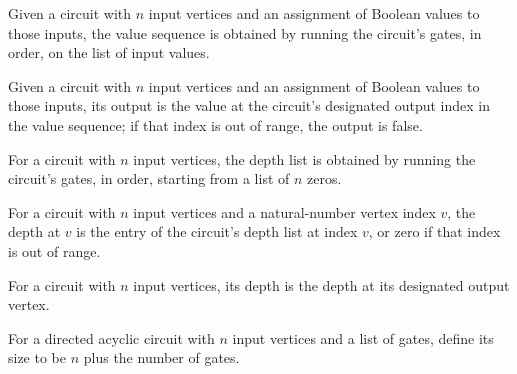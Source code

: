 \begin{definition}
\label{BoolCircuit.DAGCircuit.values}
\leanok
{}
Given a circuit with $n$ input vertices and an assignment of Boolean values to those
inputs, the value sequence is obtained by running the circuit's gates, in order, on the
list of input values.
\end{definition}

\begin{definition}
\label{BoolCircuit.DAGCircuit.eval}
\leanok
{}
Given a circuit with $n$ input vertices and an assignment of Boolean values to those
inputs, its output is the value at the circuit's designated output index in the value
sequence; if that index is out of range, the output is false.
\end{definition}

\begin{definition}
\label{BoolCircuit.DAGCircuit.depths}
\leanok
{}
For a circuit with $n$ input vertices, the depth list is obtained by running the
circuit's gates, in order, starting from a list of $n$ zeros.
\end{definition}

\begin{definition}
\label{BoolCircuit.DAGCircuit.depthAt}
\leanok
{}
For a circuit with $n$ input vertices and a natural-number vertex index $v$, the depth
at $v$ is the entry of the circuit's depth list at index $v$, or zero if that index is
out of range.
\end{definition}

\begin{definition}
\label{BoolCircuit.DAGCircuit.depth}
\leanok
{}
For a circuit with $n$ input vertices, its depth is the depth at its designated output
vertex.
\end{definition}

\begin{definition}
\label{BoolCircuit.DAGCircuit.size}
\leanok
For a directed acyclic circuit with $n$ input vertices and a list of gates, define its
size to be $n$ plus the number of gates.
\end{definition}

